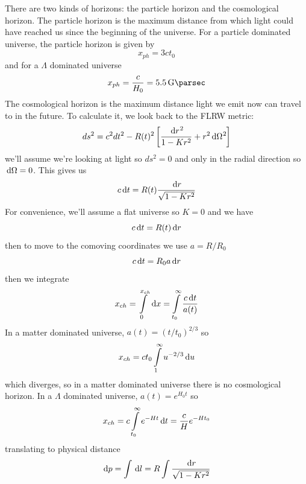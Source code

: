 There are two kinds of horizons: the particle horizon and the cosmological horizon. The particle horizon is the maximum distance from which light could have reached us since the beginning of the universe. For a particle dominated universe, the particle horizon is given by
\begin{equation}
    x_{ph} = 3ct_0
\end{equation}
and for a \(\Lambda\) dominated universe
\begin{equation}
    x_{ph} = \frac{c}{H_0} = \qty{5.5}{\giga\parsec}
\end{equation}
The cosmological horizon is the maximum distance light we emit now can travel to in the future. To calculate it, we look back to the FLRW metric:
\begin{equation}
    ds^2 = c^2 dt^2 - R(t)^2 \left[\frac{\dl r^2}{1-Kr^2} + r^2 \dl\Omega^2\right]
\end{equation}
we'll assume we're looking at light so \(ds^2 = 0\) and only in the radial direction so \(\dl \Omega = 0\). This gives us
\begin{equation}
    c \dl t = R(t) \frac{\dl r}{\sqrt{1-Kr^2}}
\end{equation}
For convenience, we'll assume a flat universe so \(K=0\) and we have
\begin{equation}
    c \dl t = R(t) \dl r
\end{equation}
then to move to the comoving coordinates we use \(a = R/R_0\)
\begin{equation}
    c \dl t = R_0 a \dl r
\end{equation}
then we integrate
\begin{equation}
    x_{ch} = \int\limits_0^{x_{ch}} \dl x = \int\limits_{t_0}^\infty \frac{c \dl t}{a(t)}
\end{equation}
In a matter dominated universe, \(a(t) = (t/t_0)^{2/3}\) so
\begin{equation}
    x_{ch} = c t_0 \int\limits_1^\infty u^{-2/3} \dl u
\end{equation}
which diverges, so in a matter dominated universe there is no cosmological horizon. In a \(\Lambda\) dominated universe, \(a(t) = e^{H_0 t}\) so
\begin{equation}
    x_{ch} = c \int\limits_{t_0}^\infty e^{-H t} \dl t = \frac{c}{H} e^{-H t_0}
\end{equation}
translating to physical distance
\begin{equation}
    \dl p = \int \dl l = R \int \frac{\dl r}{\sqrt{1-Kr^2}}
\end{equation}
